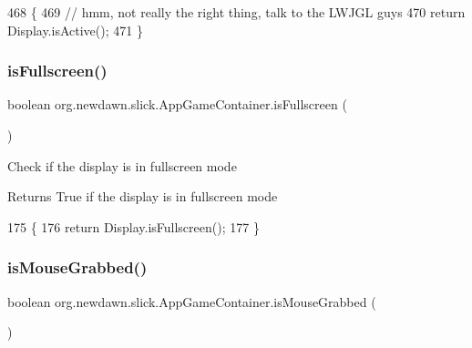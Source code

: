 \begin{DoxyCode}
468                               \{
469         \textcolor{comment}{// hmm, not really the right thing, talk to the LWJGL guys}
470         \textcolor{keywordflow}{return} Display.isActive();
471     \}
\end{DoxyCode}
\mbox{\label{classorg_1_1newdawn_1_1slick_1_1_app_game_container_a9003be0b2466514951f265f9ec2cb5b9}} 
\subsubsection{\texorpdfstring{is\+Fullscreen()}{isFullscreen()}}
{\footnotesize\ttfamily boolean org.\+newdawn.\+slick.\+App\+Game\+Container.\+is\+Fullscreen (\begin{DoxyParamCaption}{ }\end{DoxyParamCaption})\hspace{0.3cm}{\ttfamily [inline]}}

Check if the display is in fullscreen mode

\begin{DoxyReturn}{Returns}
True if the display is in fullscreen mode 
\end{DoxyReturn}

\begin{DoxyCode}
175                                   \{
176         \textcolor{keywordflow}{return} Display.isFullscreen();
177     \}
\end{DoxyCode}
\mbox{\label{classorg_1_1newdawn_1_1slick_1_1_app_game_container_a708f34691e46d211850a1e56a7589984}} 
\subsubsection{\texorpdfstring{is\+Mouse\+Grabbed()}{isMouseGrabbed()}}
{\footnotesize\ttfamily boolean org.\+newdawn.\+slick.\+App\+Game\+Container.\+is\+Mouse\+Grabbed (\begin{DoxyParamCaption}{ }\end{DoxyParamCaption})\hspace{0.3cm}{\ttfamily [inline]}}

